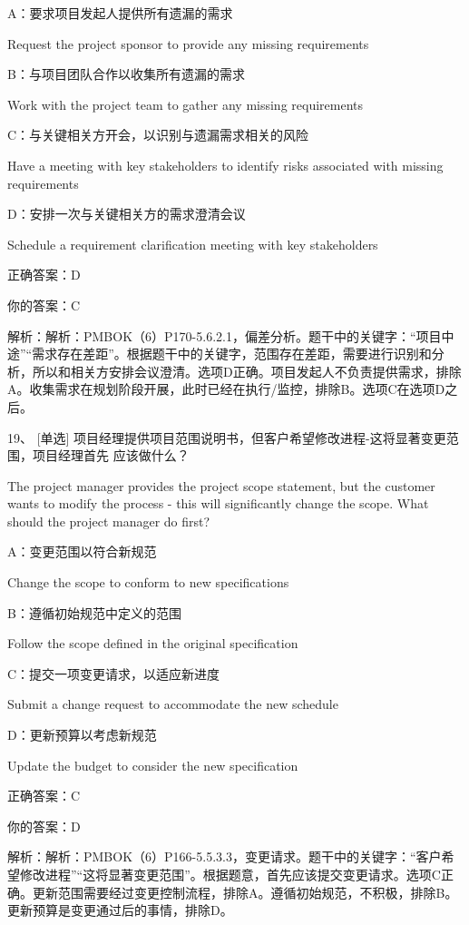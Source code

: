 A：要求项目发起人提供所有遗漏的需求

Request the project sponsor to provide any missing requirements

B：与项目团队合作以收集所有遗漏的需求

Work with the project team to gather any missing requirements

C：与关键相关方开会，以识别与遗漏需求相关的风险

Have a meeting with key stakeholders to identify risks associated with missing requirements

D：安排一次与关键相关方的需求澄清会议

Schedule a requirement clarification meeting with key stakeholders

正确答案：D

你的答案：C

解析：解析：PMBOK（6）P170-5.6.2.1，偏差分析。题干中的关键字：“项目中途”“需求存在差距”。根据题干中的关键字，范围存在差距，需要进行识别和分析，所以和相关方安排会议澄清。选项D正确。项目发起人不负责提供需求，排除A。收集需求在规划阶段开展，此时已经在执行/监控，排除B。选项C在选项D之后。



19、 [单选] 项目经理提供项目范围说明书，但客户希望修改进程-这将显著变更范围，项目经理首先 应该做什么？

The project manager provides the project scope statement, but the customer wants to modify the process - this will significantly change the scope. What should the project manager do first?

A：变更范围以符合新规范

Change the scope to conform to new specifications

B：遵循初始规范中定义的范围

Follow the scope defined in the original specification

C：提交一项变更请求，以适应新进度

Submit a change request to accommodate the new schedule

D：更新预算以考虑新规范

Update the budget to consider the new specification

正确答案：C

你的答案：D

解析：解析：PMBOK（6）P166-5.5.3.3，变更请求。题干中的关键字：“客户希望修改进程”“这将显著变更范围”。根据题意，首先应该提交变更请求。选项C正确。更新范围需要经过变更控制流程，排除A。遵循初始规范，不积极，排除B。更新预算是变更通过后的事情，排除D。


